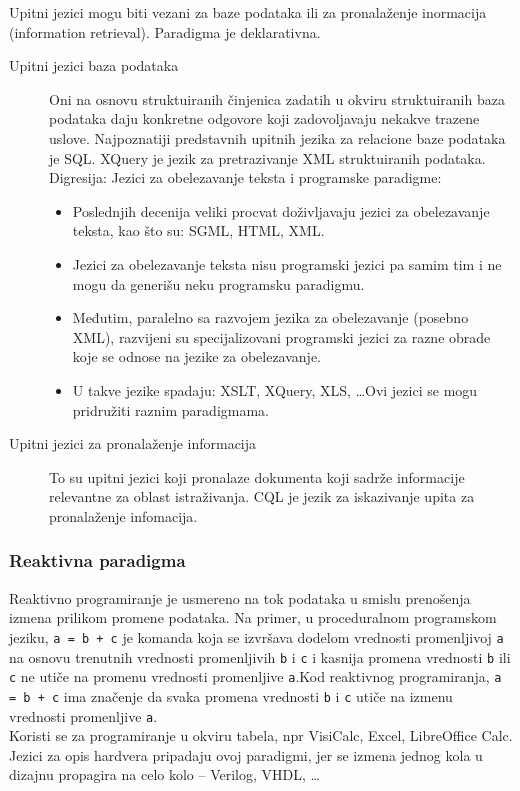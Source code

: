\documentclass[../main.tex]{subfiles}
\begin{document}
Upitni jezici mogu biti vezani za baze podataka ili za pronalaženje inormacija (information retrieval). Paradigma je deklarativna.
\begin{description}
	\item[Upitni jezici baza podataka] \hfill

	Oni na osnovu struktuiranih činjenica zadatih u okviru struktuiranih baza podataka daju konkretne odgovore koji zadovoljavaju nekakve trazene uslove. Najpoznatiji predstavnih upitnih jezika za relacione baze podataka je SQL. XQuery je jezik za pretrazivanje XML struktuiranih podataka.\\
Digresija: Jezici za obelezavanje teksta i programske paradigme:
	\begin{itemize}
		\item Poslednjih decenija veliki procvat doživljavaju jezici za obelezavanje teksta, kao što su: SGML, HTML, XML.
		\item Jezici za obelezavanje teksta nisu programski jezici pa samim tim i ne mogu da generišu neku programsku paradigmu.
		\item Međutim, paralelno sa razvojem jezika za obelezavanje (posebno XML), razvijeni su specijalizovani programski jezici za razne obrade koje se odnose na jezike za obelezavanje.
		\item U takve jezike spadaju: XSLT, XQuery, XLS, \ldots Ovi jezici se mogu pridružiti raznim paradigmama.
	\end{itemize}

	\item[Upitni jezici za pronalaženje informacija] \hfill

	To su upitni jezici koji pronalaze dokumenta koji sadrže informacije relevantne za oblast istraživanja. CQL je jezik za iskazivanje upita za pronalaženje infomacija.
\end{description}

\subsubsection{Reaktivna paradigma}											

Reaktivno programiranje je usmereno na tok podataka u smislu prenošenja izmena prilikom promene podataka. Na primer, u proceduralnom programskom jeziku, \texttt{a = b + c} je komanda koja se izvršava dodelom vrednosti promenljivoj \texttt{a} na osnovu trenutnih vrednosti promenljivih \texttt{b} i \texttt{c} i kasnija promena vrednosti \texttt{b} ili \texttt{c} ne utiče na promenu vrednosti promenljive \texttt{a}.Kod reaktivnog programiranja, \texttt{a = b + c} ima značenje da svaka promena vrednosti \texttt{b} i \texttt{c} utiče na izmenu vrednosti promenljive \texttt{a}.\\
Koristi se za programiranje u okviru tabela, npr VisiCalc, Excel, LibreOffice Calc. Jezici za opis hardvera pripadaju ovoj paradigmi, jer se izmena jednog kola u dizajnu propagira na celo kolo -- Verilog, VHDL, \ldots 
\end{document}
